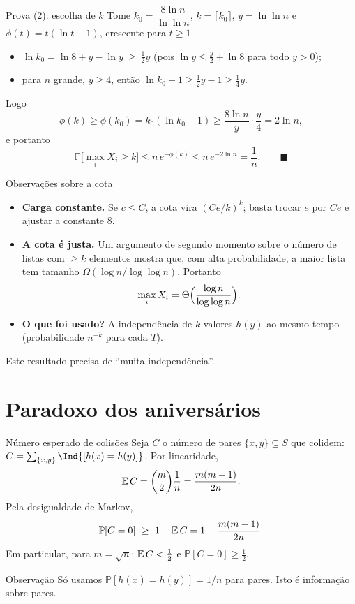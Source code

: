 \documentclass[aspectratio=169,11pt]{beamer}
\newcommand{\PP}{\mathbb P}
\begin{document}
\begin{frame}{Prova (2): escolha de $k$}
  Tome $k_0=\dfrac{8\ln n}{\ln\ln n}$, $k=\lceil k_0\rceil$,
  $y=\ln\ln n$ e $\phi(t)=t(\ln t-1)$, crescente para $t\ge1$.
  \pause
  \begin{itemize}
  \item $\ln k_0=\ln8+y-\ln y\ \ge\ \tfrac12y$ (pois $\ln y\le\tfrac y2+\ln8$ para todo $y>0$);
  \item para $n$ grande, $y\ge4$, então $\ln k_0-1\ge\tfrac12y-1\ge\tfrac14y$.
  \end{itemize}
  \pause
  Logo
  \[
    \phi(k)\ge\phi(k_0)=k_0(\ln k_0-1)\ge\frac{8\ln n}{y}\cdot\frac y4=2\ln n,
  \]
  e portanto
  \[
    \PP\bigl[\max_iX_i\ge k\bigr]\le n\,e^{-\phi(k)}\le n\,e^{-2\ln n}=\frac1n.
    \qquad\blacksquare
  \]
\end{frame}

\begin{frame}{Observações sobre a cota}
  \begin{itemize}
  \item \textbf{Carga constante.} Se $c\le C$, a cota vira $(Ce/k)^k$; basta
    trocar $e$ por $Ce$ e ajustar a constante $8$.
    \pause
  \item \textbf{A cota é justa.} Um argumento de segundo momento sobre o
    número de listas com $\ge k$ elementos mostra que, com alta probabilidade,
    a maior lista tem tamanho $\Omega(\log n/\log\log n)$. Portanto
    \[
      \max_iX_i=\Theta\Bigl(\frac{\log n}{\log\log n}\Bigr).
    \]
    \pause
  \item \textbf{O que foi usado?} A independência de $k$ valores $h(y)$ ao
    mesmo tempo (probabilidade $n^{-k}$ para cada $T$).
  \end{itemize}
  \begin{alertblock}{}
    Este resultado precisa de ``\alert{muita} independência''.
  \end{alertblock}
\end{frame}

\section{Paradoxo dos aniversários}

\begin{frame}{Número esperado de colisões}
  Seja $C$ o número de pares $\{x,y\}\subseteq S$ que colidem:
  $C=\sum_{\{x,y\}}\Ind{[h(x)=h(y)]}$. Por linearidade,
  \[
    \mathbb{E}\,C=\binom m2\frac1n=\frac{m(m-1)}{2n}.
  \]
  \pause
  Pela desigualdade de Markov,
  \[
    \PP[C=0]\ \ge\ 1-\E\,C=1-\frac{m(m-1)}{2n}.
  \]
  Em particular, para $m=\sqrt n$: $\mathbb{E}\,C<\tfrac12$ e $\PP[C=0]\ge\tfrac12$.
  \pause
  \begin{block}{Observação}
    Só usamos $\PP[h(x)=h(y)]=1/n$ para pares. Isto é \alert{informação sobre
    pares}.
  \end{block}
\end{frame}
\end{document}
